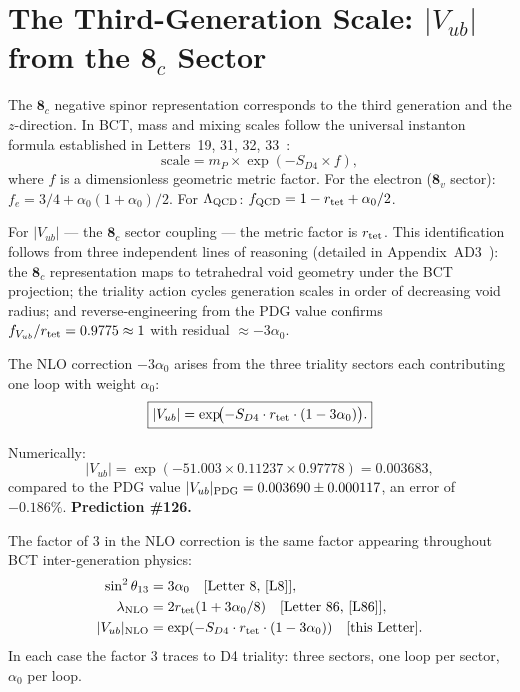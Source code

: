 \documentclass[aps,prl,twocolumn,showpacs,superscriptaddress]{revtex4-2}
\begin{document}
\section{The Third-Generation Scale: $|V_{ub}|$ from the $\mathbf{8}_c$ Sector}

The $\mathbf{8}_c$ negative spinor representation corresponds to the
third generation and the $z$-direction. In BCT, mass and mixing scales
follow the universal instanton formula established in
Letters~19, 31, 32, 33~\cite{L19,L31,L32,L33}:
\begin{equation}
  \text{scale} = m_P \times \exp(-S_{D4} \times f),
  \label{eq:instanton}
\end{equation}
where $f$ is a dimensionless geometric metric factor. For the electron
($\mathbf{8}_v$ sector): $f_e = 3/4 + \alpha_0(1+\alpha_0)/2$. For
$\Lambda_{\rm QCD}$: $f_{\rm QCD} = 1 - r_{\rm tet} + \alpha_0/2$.

For $|V_{ub}|$ --- the $\mathbf{8}_c$ sector coupling --- the metric
factor is $r_{\rm tet}$. This identification follows from three
independent lines of reasoning (detailed in Appendix~AD3~\cite{AD3}):
the $\mathbf{8}_c$ representation maps to tetrahedral void geometry
under the BCT projection; the triality action cycles generation scales
in order of decreasing void radius; and reverse-engineering from the
PDG value confirms $f_{V_{ub}}/r_{\rm tet} = 0.9775 \approx 1$ with
residual $\approx -3\alpha_0$.

The NLO correction $-3\alpha_0$ arises from the three triality sectors
each contributing one loop with weight $\alpha_0$:
\begin{equation}
  \boxed{|V_{ub}| = \exp\!\bigl(-S_{D4}\cdot r_{\rm tet}
  \cdot(1 - 3\alpha_0)\bigr).}
  \label{eq:Vub}
\end{equation}

Numerically:
\begin{equation}
  |V_{ub}| = \exp(-51.003 \times 0.11237 \times 0.97778)
           = 0.003683,
\end{equation}
compared to the PDG value $|V_{ub}|_{\rm PDG} = 0.003690 \pm 0.000117$,
an error of $-0.186\%$. \textbf{Prediction \#126.}

The factor of $3$ in the NLO correction is the same factor appearing
throughout BCT inter-generation physics:
\begin{align}
  \sin^2\theta_{13} &= 3\alpha_0 \quad \text{[Letter~8, \cite{L8}]},\\
  \lambda_{\rm NLO} &= 2r_{\rm tet}(1 + 3\alpha_0/8)
    \quad \text{[Letter~86, \cite{L86}]},\\
  |V_{ub}|_{\rm NLO} &= \exp(-S_{D4}\cdot r_{\rm tet}\cdot(1-3\alpha_0))
    \quad \text{[this Letter]}.
\end{align}
In each case the factor $3$ traces to D4 triality: three sectors, one
loop per sector, $\alpha_0$ per loop.
\end{document}
